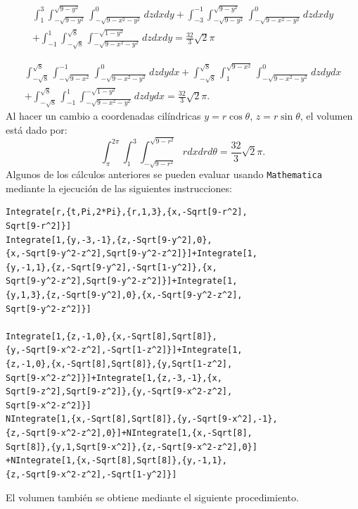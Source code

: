 {\small
\begin{multline*}
\int_{1}^{3}\int_{-\sqrt{9-y^2}}^{\sqrt{9-y^2}}\int_{-\sqrt{9-x^2 -y^2 }}^{0}dzdxdy+\int_{-3}^{-1}\int_{-\sqrt{9-y^2 }}^{\sqrt{9-y^2 }}\int_{-\sqrt{9-x^2 -y^2 }}^{0}dzdxdy\\
+\int_{-1}^{1}\int_{-\sqrt{8}}^{\sqrt{8}}\int_{-\sqrt{9-x^2 -y^2 }}^{-\sqrt{1-y^2 }}dzdxdy= \frac{32}{3}\sqrt{2}\pi
\end{multline*}
}

{\small
\begin{multline*}
\int_{-\sqrt{8}}^{\sqrt{8}}\int_{-\sqrt{9-x^2 }}^{-1}\int_{-\sqrt{9-x^2 -y^2 }}^{0}dzdydx+\int_{-\sqrt{8}}^{\sqrt{8}}\int_{1}^{\sqrt{9-x^2 }}\int_{-\sqrt{9-x^2 -y^2 }}^{0}dzdydx\\
+\int_{-\sqrt{8}}^{\sqrt{8}}\int_{-1}^{1}\int_{-\sqrt{9-x^2 -y^2 }}^{-\sqrt{1-y^2 }}dzdydx= \frac{32}{3}\sqrt{2}\pi.
\end{multline*}
}
%
Al hacer un cambio a coordenadas cilíndricas
$y = r\cos \theta$, $z = r\sin \theta$, el volumen está dado por:
%
{\small
\[\int_{\pi}^{2\pi}\int_{1}^{3}\int_{-\sqrt{9-r^2}}^{\sqrt{9-r^2}}rdxdrd\theta=\frac{32}{3}\sqrt{2}\pi.\]
}
%
Algunos de los cálculos anteriores se pueden evaluar usando \verb"Mathematica"
mediante la ejecución de las siguientes instrucciones:

\begin{tcolorbox}[title=\bf Instrucción en \verb"Mathematica"]\begin{Verbatim}[formatcom=\letraverbatim]
Integrate[r,{t,Pi,2*Pi},{r,1,3},{x,-Sqrt[9-r^2],
Sqrt[9-r^2]}]
Integrate[1,{y,-3,-1},{z,-Sqrt[9-y^2],0},
{x,-Sqrt[9-y^2-z^2],Sqrt[9-y^2-z^2]}]+Integrate[1,
{y,-1,1},{z,-Sqrt[9-y^2],-Sqrt[1-y^2]},{x,
Sqrt[9-y^2-z^2],Sqrt[9-y^2-z^2]}]+Integrate[1,
{y,1,3},{z,-Sqrt[9-y^2],0},{x,-Sqrt[9-y^2-z^2],
Sqrt[9-y^2-z^2]}]

Integrate[1,{z,-1,0},{x,-Sqrt[8],Sqrt[8]},
{y,-Sqrt[9-x^2-z^2],-Sqrt[1-z^2]}]+Integrate[1,
{z,-1,0},{x,-Sqrt[8],Sqrt[8]},{y,Sqrt[1-z^2],
Sqrt[9-x^2-z^2]}]+Integrate[1,{z,-3,-1},{x,
Sqrt[9-z^2],Sqrt[9-z^2]},{y,-Sqrt[9-x^2-z^2],
Sqrt[9-x^2-z^2]}]
NIntegrate[1,{x,-Sqrt[8],Sqrt[8]},{y,-Sqrt[9-x^2],-1},
{z,-Sqrt[9-x^2-z^2],0}]+NIntegrate[1,{x,-Sqrt[8],
Sqrt[8]},{y,1,Sqrt[9-x^2]},{z,-Sqrt[9-x^2-z^2],0}]
+NIntegrate[1,{x,-Sqrt[8],Sqrt[8]},{y,-1,1},
{z,-Sqrt[9-x^2-z^2],-Sqrt[1-y^2]}]
\end{Verbatim}
\end{tcolorbox}

El volumen también se obtiene mediante el siguiente procedimiento.

